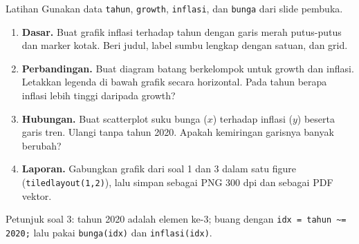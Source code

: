 \documentclass[10pt,aspectratio=169]{beamer}
\newcommand{\kd}[1]{\texttt{#1}}
\begin{document}
\begin{frame}{Latihan}
Gunakan data \kd{tahun}, \kd{growth}, \kd{inflasi}, dan \kd{bunga} dari slide pembuka.
\begin{enumerate}
  \item \textbf{Dasar.} Buat grafik inflasi terhadap tahun dengan garis \alert{merah putus-putus} dan marker kotak. Beri judul, label sumbu lengkap dengan satuan, dan grid.
  \item \textbf{Perbandingan.} Buat diagram batang berkelompok untuk growth dan inflasi. Letakkan legenda di bawah grafik secara horizontal. Pada tahun berapa inflasi lebih tinggi daripada growth?
  \item \textbf{Hubungan.} Buat scatterplot suku bunga ($x$) terhadap inflasi ($y$) beserta garis tren. Ulangi tanpa tahun 2020. Apakah kemiringan garisnya banyak berubah?
  \item \textbf{Laporan.} Gabungkan grafik dari soal 1 dan 3 dalam satu figure (\kd{tiledlayout(1,2)}), lalu simpan sebagai PNG 300 dpi dan sebagai PDF vektor.
\end{enumerate}
\smallskip
{\small Petunjuk soal 3: tahun 2020 adalah elemen ke-3; buang dengan \kd{idx = tahun \textasciitilde= 2020;} lalu pakai \kd{bunga(idx)} dan \kd{inflasi(idx)}.}
\end{frame}
\end{document}
